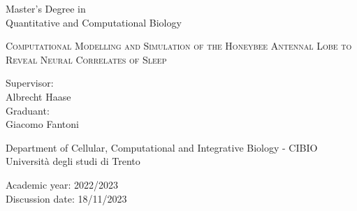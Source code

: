 \graphicspath{{title_page/images/}}

\pagestyle{empty}

\begin{center}

  \begin{figure}[h!]
    \centerline{}
  \end{figure}

  \vspace{1 cm}

  \Large{Master's Degree in\\Quantitative and Computational Biology\\}
  \vspace{1 cm}

  \LARGE\textsc{Computational Modelling and Simulation of the Honeybee Antennal Lobe to Reveal Neural Correlates of Sleep\\}
  \vspace{0.5 cm}
  \begin{multicols}{2}
    \LARGE{Supervisor:\\Albrecht Haase}\\
    \columnbreak
    \LARGE{Graduant:\\Giacomo Fantoni}
  \end{multicols}
  \vspace{0.5 cm}

  \vspace{9 cm}
  \Large{Department of Cellular, Computational and Integrative Biology - CIBIO\\}
  \Large{Università degli studi di Trento}
  \vspace{0.5 cm}


  \Large{Academic year: 2022/2023}\\
  \Large{Discussion date: 18/11/2023}

\end{center}
